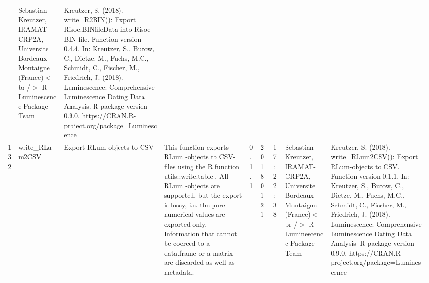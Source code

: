 \begin{table}[ht]
\begin{tabular}{rllllllll}
 & Sebastian Kreutzer, IRAMAT-CRP2A, Universite Bordeaux Montaigne (France)$<$br /$>$  R Luminescence Package Team & Kreutzer, S. (2018). write\_R2BIN(): Export Risoe.BINfileData into Risoe BIN-file. Function version 0.4.4. In: Kreutzer, S., Burow, C., Dietze, M., Fuchs, M.C., Schmidt, C., Fischer, M., Friedrich, J. (2018). Luminescence: Comprehensive Luminescence Dating Data Analysis. R package version 0.9.0. https://CRAN.R-project.org/package=Luminescence
 \\ 
  132 & write\_RLum2CSV & Export RLum-objects to CSV & This function exports  RLum -objects to CSV-files using the R function utils::write.table . All  RLum -objects are supported, but the export is lossy, i.e. the pure numerical values are exported only. Information that cannot be coerced to a  data.frame  or a  matrix  are discarded as well as metadata. & 0.1.1 & 2018-01-21 & 17:22:38
 & Sebastian Kreutzer, IRAMAT-CRP2A, Universite Bordeaux Montaigne (France)$<$br /$>$  R Luminescence Package Team & Kreutzer, S. (2018). write\_RLum2CSV(): Export RLum-objects to CSV. Function version 0.1.1. In: Kreutzer, S., Burow, C., Dietze, M., Fuchs, M.C., Schmidt, C., Fischer, M., Friedrich, J. (2018). Luminescence: Comprehensive Luminescence Dating Data Analysis. R package version 0.9.0. https://CRAN.R-project.org/package=Luminescence
 \\ 
   \hline
\end{tabular}
\end{table}

